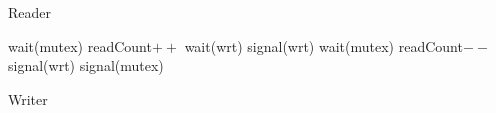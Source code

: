 \documentclass{article}
\begin{document}
    \begin{multicols*}{2}
      \begin{algorithm}[H]
      \caption{Reader}
      \end{algorithm}

      \vfill
      \columnbreak

      \begin{algorithm}[H]
         {
          wait(mutex)\;
          readCount$++$\;
           {
            wait(wrt)\;
          }
          signal(wrt)\;
          \label{cmt}
          wait(mutex)\;
          readCount$--$\;
           {
            signal(wrt)\;
          }
          signal(mutex)\;
        }
      \caption{Writer}
      \end{algorithm}
    \end{multicols*}
\end{document}
